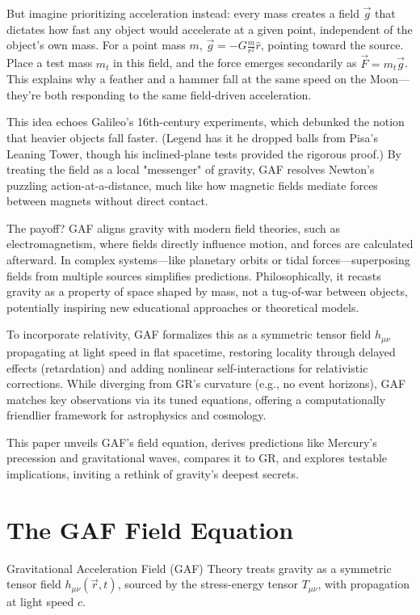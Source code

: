 \documentclass{article}
\begin{document}
But imagine prioritizing acceleration instead: every mass creates a field $ \vec{g} $ that dictates how fast any object would accelerate at a given point, independent of the object's own mass. For a point mass $ m $, $ \vec{g} = -G \frac{m}{r^2} \hat{r} $, pointing toward the source. Place a test mass $ m_t $ in this field, and the force emerges secondarily as $ \vec{F} = m_t \vec{g} $. This explains why a feather and a hammer fall at the same speed on the Moon—they're both responding to the same field-driven acceleration.

This idea echoes Galileo's 16th-century experiments, which debunked the notion that heavier objects fall faster. (Legend has it he dropped balls from Pisa's Leaning Tower, though his inclined-plane tests provided the rigorous proof.) By treating the field as a local "messenger" of gravity, GAF resolves Newton's puzzling action-at-a-distance, much like how magnetic fields mediate forces between magnets without direct contact.

The payoff? GAF aligns gravity with modern field theories, such as electromagnetism, where fields directly influence motion, and forces are calculated afterward. In complex systems—like planetary orbits or tidal forces—superposing fields from multiple sources simplifies predictions. Philosophically, it recasts gravity as a property of space shaped by mass, not a tug-of-war between objects, potentially inspiring new educational approaches or theoretical models.

To incorporate relativity, GAF formalizes this as a symmetric tensor field $ h_{\mu\nu} $ propagating at light speed in flat spacetime, restoring locality through delayed effects (retardation) and adding nonlinear self-interactions for relativistic corrections. While diverging from GR's curvature (e.g., no event horizons), GAF matches key observations via its tuned equations, offering a computationally friendlier framework for astrophysics and cosmology.

This paper unveils GAF's field equation, derives predictions like Mercury's precession and gravitational waves, compares it to GR, and explores testable implications, inviting a rethink of gravity's deepest secrets.

\section{The GAF Field Equation}

Gravitational Acceleration Field (GAF) Theory treats gravity as a symmetric tensor field $ h_{\mu\nu}(\vec{r}, t) $, sourced by the stress-energy tensor $ T_{\mu\nu} $, with propagation at light speed $ c $. 
\end{document}
